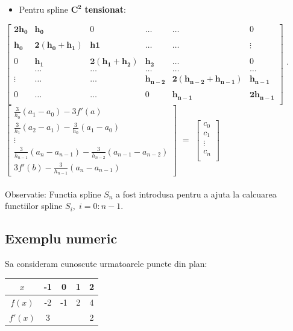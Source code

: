 \documentclass{article}
\begin{document}
\begin{itemize}
    \item Pentru spline $\mathbf{C^2}$ \textbf{tensionat}:
\end{itemize}
\hspace{-2.35cm}$\begin{bmatrix}
    \mathbf{2h_0} & \mathbf{h_0} & 0 & \dots & \dots & 0 \\\\
    \mathbf{h_0} & \mathbf{2(h_0+h_1)} & \mathbf{h1} & \dots  & \dots & \vdots \\\\
    0 & \mathbf{h_1} & \mathbf{2(h_1+h_2)} & \mathbf{h_2} & \dots & 0 \\
     & \dots & \dots & \dots & \dots & \dots \\
    \vdots & \dots & \dots & \mathbf{h_{n-2}} & \mathbf{2(h_{n-2}+h_{n-1})} & \mathbf{h_{n-1}} \\\\
    0 & \dots & \dots & 0 & \mathbf{h_{n-1}} & \mathbf{2h_{n-1}} \\
\end{bmatrix}$
$\cdot$
$\begin{bmatrix}
    \frac{3}{h_0}(a_1-a_0) - 3f'(a) \\
    \frac{3}{h_1}(a_2-a_1) - \frac{3}{h_0}(a_1-a_0) \\
    \vdots \\
    \frac{3}{h_{n-1}}(a_n-a_{n-1}) - \frac{3}{h_{n-2}}(a_{n-1}-a_{n-2}) \\
    3f'(b) - \frac{3}{h_{n-1}}(a_n-a_{n-1})
\end{bmatrix}$
$=$
$\begin{bmatrix}
    c_0 \\
    c_1 \\
    \vdots \\
    c_n \\
\end{bmatrix}$\\\\

\noindent Observatie: Functia spline $S_n$ a fost introdusa pentru a ajuta la calcuarea functiilor spline $S_i,\; i = 0 : n-1$.


\subsection{Exemplu numeric}
\tab Sa consideram cunoscute urmatoarele puncte din plan:
\begin{tabular}{c | c | c | c | c}
    $x$ & -1 & 0 & 1 & 2 \\
    \hline
    $f(x)$ & -2 & -1 & 2 & 4 \\
    \hline
    $f'(x)$ & 3 & & & 2 \\
\end{tabular}\\
\end{document}
